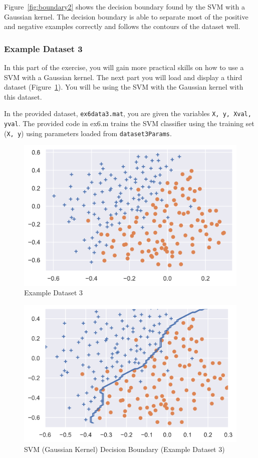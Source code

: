\documentclass[12pt]{article}
\begin{document}
Figure~\ref{fig:boundary2} shows the decision boundary found by the SVM with a Gaussian kernel. The decision boundary is able to separate most of the positive and negative examples correctly and follows the contours of the dataset well.

\subsubsection{Example Dataset 3}

In this part of the exercise, you will gain more practical skills on how to use a SVM with a Gaussian kernel. The next part you will load and display a third dataset (Figure~\ref{fig:scatter3}). You will be using the SVM with the Gaussian kernel with this dataset.

In the provided dataset, \texttt{ex6data3.mat}, you are given the variables \texttt{X, y, Xval, yval}. The provided code in ex6.m trains the SVM classifier using the training set (\texttt{X, y}) using parameters loaded from \texttt{dataset3Params}.

\begin{figure}[h!]
  \centering
  \includegraphics[scale=0.6]{scatter3.png}
  \caption{Example Dataset 3}
  \label{fig:scatter3}
\end{figure}

\begin{figure}[h!]
  \centering
  \includegraphics[scale=0.6]{boundary3.png}
  \caption{SVM (Gaussian Kernel) Decision Boundary (Example Dataset 3)}
  \label{fig:boundary3}
\end{figure}
\end{document}
